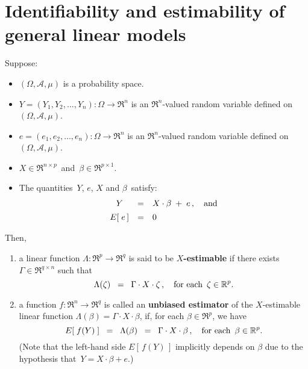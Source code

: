 

\section{Identifiability and estimability of general linear models}
\setcounter{theorem}{0}
\setcounter{equation}{0}

\renewcommand{\theenumi}{\roman{enumi}}
\renewcommand{\labelenumi}{\textnormal{(\theenumi)}$\;\;$}


\begin{definition}
\mbox{}
\vskip 0.1cm
\noindent
Suppose:
\begin{itemize}
\item
	$(\Omega,\mathcal{A},\mu)$ is a probability space.
\item
	$Y = (Y_{1}, Y_{2}, \ldots, Y_{n}) : \Omega \longrightarrow \Re^{n}$ is an $\Re^{n}$-valued random variable
	defined on $(\Omega,\mathcal{A},\mu)$.
\item
	$e = (e_{1}, e_{2}, \ldots, e_{n}) : \Omega \longrightarrow \Re^{n}$ is an $\Re^{n}$-valued random variable
	defined on $(\Omega,\mathcal{A},\mu)$.
\item
	$X \in \Re^{n \times p}$\, and \,$\beta \in \Re^{p \times 1}$.
\item
	The quantities \,$Y$, $e$, $X$ and $\beta$\, satisfy:
	\begin{equation*}
	\begin{array}{ccl}
	Y & = & X \cdot \beta \; + \; e\,, \quad\textnormal{and}
	\\
	E\!\left[\;e\,\right] & \overset{{\color{white}\vert}}{=} & 0
	\end{array}
	\end{equation*}
\end{itemize}
Then,
\begin{enumerate}
\item
	a linear function $\Lambda : \Re^{p} \longrightarrow \Re^{q}$ is said to be \textbf{$X$-estimable}
	if there exists $\Gamma \in \Re^{q \times n}$ such that
	\begin{equation*}
	\Lambda(\zeta) \;\; =\;\; \Gamma \cdot X \cdot \zeta\,,
	\quad
	\textnormal{for each \,$\zeta \in \Re^{p}$}.
	\end{equation*}
\item
	a function $f : \Re^{n} \longrightarrow \Re^{q}$ is called an \textbf{unbiased estimator}
	of the $X$-estimable linear function $\Lambda(\beta) = \Gamma \cdot X \cdot \beta$,
	if, for each $\beta \in \Re^{p}$, we have
	\begin{equation*}
	E\!\left[\;f(Y)\;\right] \;\; =\;\; \Lambda(\beta) \;\;=\;\; \Gamma \cdot X \cdot \beta\,,
	\quad
	\textnormal{for each \,$\beta \in \Re^{p}$}.
	\end{equation*}
	(Note that the left-hand side $E\!\left[\,f(Y)\,\right]$ implicitly depends on $\beta$
	due to the hypothesis that \,$Y = X \cdot \beta + e$.)
\end{enumerate}
\end{definition}


